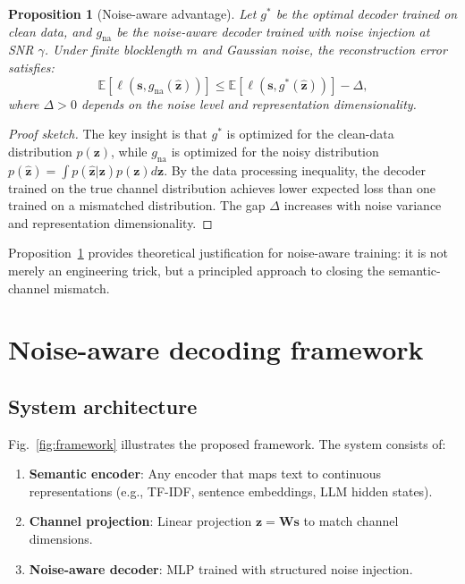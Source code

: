 \documentclass[a4paper,fleqn]{cas-sc}
\newtheorem{proposition}{Proposition}
\begin{document}
\begin{proposition}[Noise-aware advantage]\label{prop:dominance}
Let $g^*$ be the optimal decoder trained on clean data, and $g_{\text{na}}$ be the noise-aware decoder trained with noise injection at SNR $\gamma$. Under finite blocklength $m$ and Gaussian noise, the reconstruction error satisfies:
\begin{equation}
\mathbb{E}[\ell(\mathbf{s}, g_{\text{na}}(\hat{\mathbf{z}}))] \leq \mathbb{E}[\ell(\mathbf{s}, g^*(\hat{\mathbf{z}}))] - \Delta,
\end{equation}
where $\Delta > 0$ depends on the noise level and representation dimensionality.
\end{proposition}

\begin{proof}[Proof sketch]
The key insight is that $g^*$ is optimized for the clean-data distribution $p(\mathbf{z})$, while $g_{\text{na}}$ is optimized for the noisy distribution $p(\hat{\mathbf{z}}) = \int p(\hat{\mathbf{z}}|\mathbf{z}) p(\mathbf{z}) d\mathbf{z}$. By the data processing inequality, the decoder trained on the true channel distribution achieves lower expected loss than one trained on a mismatched distribution. The gap $\Delta$ increases with noise variance and representation dimensionality.
\end{proof}

\begin{remark}
Proposition~\ref{prop:dominance} provides theoretical justification for noise-aware training: it is not merely an engineering trick, but a principled approach to closing the semantic-channel mismatch.
\end{remark}


\section{Noise-aware decoding framework}\label{sec:framework}

\subsection{System architecture}

Fig.~\ref{fig:framework} illustrates the proposed framework. The system consists of:
\begin{enumerate}
\item \textbf{Semantic encoder}: Any encoder that maps text to continuous representations (e.g., TF-IDF, sentence embeddings, LLM hidden states).
\item \textbf{Channel projection}: Linear projection $\mathbf{z} = \mathbf{W} \mathbf{s}$ to match channel dimensions.
\item \textbf{Noise-aware decoder}: MLP trained with structured noise injection.
\end{enumerate}
\end{document}
